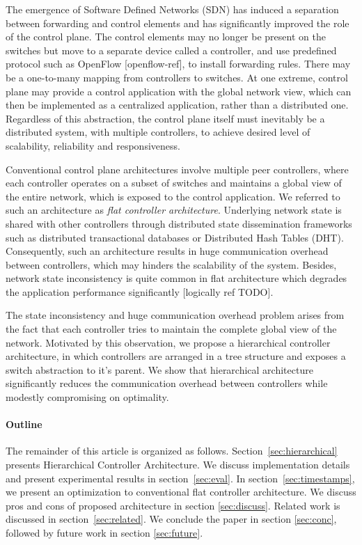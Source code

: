 \documentclass[10pt, twocolumn]{article}
\begin{document}
The emergence of Software Defined Networks (SDN) has induced a separation between forwarding and control elements and has significantly improved the role of the control plane. The control elements may no longer be present on the switches but move to a separate device called a controller, and use predefined protocol such as OpenFlow [openflow-ref], to install forwarding rules. There may be a one-to-many mapping from controllers to switches. At one extreme, control plane may provide a control application with the global network view, which can then be implemented as a centralized application, rather than a distributed one. Regardless of this abstraction, the control plane itself must inevitably be a distributed system, with multiple controllers, to achieve desired level of scalability, reliability and responsiveness.

Conventional control plane architectures involve multiple peer controllers, where each controller operates on a subset of switches and maintains a global view of the entire network, which is exposed to the control application. We referred to such an architecture as \emph{flat controller architecture}. Underlying network state is shared with other controllers through distributed state dissemination frameworks such as distributed transactional databases or Distributed Hash Tables (DHT). Consequently, such an architecture results in huge communication overhead between controllers, which may hinders the scalability of the system. Besides, network state inconsistency is quite common in flat architecture which degrades the application performance significantly [logically ref TODO].

The state inconsistency and huge communication overhead problem arises from the fact that each controller tries to maintain the complete global view of the network. Motivated by this observation, we propose a hierarchical controller architecture, in which controllers are arranged in a tree structure and exposes a switch abstraction to it's parent. We show that hierarchical architecture significantly reduces the communication overhead between controllers while modestly compromising on optimality.     

\paragraph{Outline}
The remainder of this article is organized as follows. Section~\ref{sec:hierarchical} presents Hierarchical Controller Architecture. We discuss implementation details and present experimental results in section~\ref{sec:eval}. In section~\ref{sec:timestamps}, we present an optimization to conventional flat controller architecture. We discuss pros and cons of proposed architecture in section \ref{sec:discuss}. Related work is discussed in section~\ref{sec:related}. We conclude the paper in section \ref{sec:conc}, followed by future work in section \ref{sec:future}.  
\end{document}
